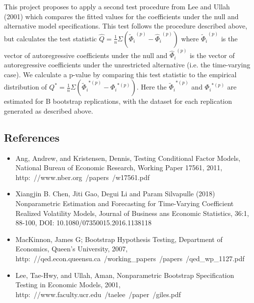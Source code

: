 \documentclass{article}
\begin{document}
\newline
\newline
This project proposes to apply a second test procedure from Lee and Ullah (2001) which compares the fitted values for the coefficients under the null and alternative model specifications. This test follows the procedure described above, but calculates the test statistic \(\hat{Q} = \frac{1}{n} \Sigma ({\tilde{\Phi}_{i}}^{(p)} - {\hat{\Phi}_{i}}^{(p)} )\) where \({\tilde{\Phi}_{i}}^{(p)}\) is the vector of autoregressive coefficients under the null and \({\hat{\Phi}_{i}}^{(p)} \) is the vector of autoregressive coefficients under the unrestricted alternative (i.e. the time-varying case). We calculate a p-value by comparing this test statistic to the empirical distribution of \(Q^{*} = \frac{1}{n} \Sigma ({{\tilde{\Phi}}_{i}}^{*(p)} - {{{\Phi}}_{i}}^{*(p)} )\). Here the \({{\tilde{\Phi}}_{i}}^{*(p)}\) and \({{{\Phi}}_{i}}^{*(p)}\) are estimated for B bootstrap replications, with the dataset for each replication generated as described above.

\subsection*{References}

\renewcommand{\theenumi}{\Roman{enumi}}
\begin{itemize}
	\item{Ang, Andrew, and Kristensen, Dennis, Testing Conditional Factor Models, National Bureau of Economic Research, Working Paper 17561, 2011, http:\ //www.nber.org\ /papers\ /w17561.pdf}
	\item{Xiangjin B. Chen, Jiti Gao, Degui Li and Param Silvapulle (2018) Nonparametric Estimation and Forecasting for Time-Varying Coefficient Realized Volatility Models, Journal of Business ans Economic Statistics, 36:1, 88-100, DOI: 10.1080/07350015.2016.1138118}
	\item{MacKinnon, James G; Bootstrap Hypothesis Testing, Department of Economics, Queen's University, 2007, http:\ //qed.econ.queensu.ca\ /working\_papers\ /papers\ /qed\_wp\_1127.pdf }
	\item{Lee, Tae-Hwy, and Ullah, Aman, Nonparametric Bootstrap Specification Testing in Economic Models, 2001, http:\ //www.faculty.ucr.edu\ /taelee\ /paper\ /giles.pdf}
\end{itemize}
\end{document}
